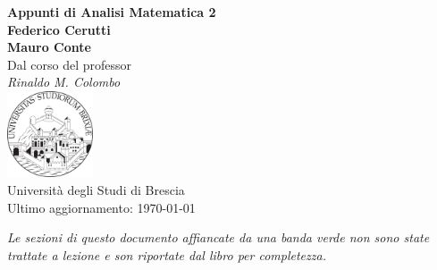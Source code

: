 \documentclass[a4paper,twoside,italian]{book}
\begin{document}
\pagestyle{headings}

\frontmatter
\begin{titlepage}
	\begin{center}
		{\huge\bfseries Appunti di Analisi Matematica 2\\}
		\vspace{1.5cm}
		{\Large\bfseries Federico Cerutti\\Mauro Conte\\}
		\vspace{2cm}
		{Dal corso del professor}\\[5pt]
		\emph{{Rinaldo M. Colombo}}\\[2cm]
		\vfill
		\includegraphics[width=0.19\textwidth]{unibs-logo.png}\\[5pt]
		{Università degli Studi di Brescia}\\[10pt]
		{Ultimo aggiornamento: \today}
	\end{center}
\end{titlepage}

\begin{center}
\itshape
\cbstart
Le sezioni di questo documento affiancate da una banda verde non sono state trattate a lezione e son riportate dal libro per completezza.
\cbend
\end{center}
\vfill
\doclicenseThis

\newpage
{}
\tableofcontents


\mainmatter









\backmatter
\end{document}
